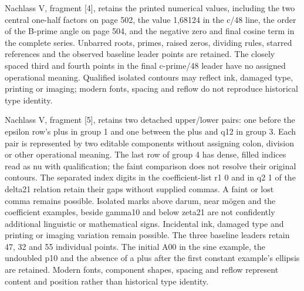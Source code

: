 Nachlass V, fragment [4], retains the printed numerical values, including the two central one-half factors on page 502, the value 1,68124 in the c/48 line, the order of the B-prime angle on page 504, and the negative zero and final cosine term in the complete series. Unbarred roots, primes, raised zeros, dividing rules, starred references and the observed baseline leader points are retained. The closely spaced third and fourth points in the final c-prime/48 leader have no assigned operational meaning. Qualified isolated contours may reflect ink, damaged type, printing or imaging; modern fonts, spacing and reflow do not reproduce historical type identity.

Nachlass V, fragment [5], retains two detached upper/lower pairs: one before the epsilon row’s plus in group 1 and one between the plus and q12 in group 3. Each pair is represented by two editable components without assigning colon, division or other operational meaning. The last row of group 4 has dense, filled indices read as nu with qualification; the faint comparison does not resolve their original contours. The separated index digits in the coefficient-list r1 0 and in q2 1 of the delta21 relation retain their gaps without supplied commas. A faint or lost comma remains possible. Isolated marks above darum, near mögen and the coefficient examples, beside gamma10 and below zeta21 are not confidently additional linguistic or mathematical signs. Incidental ink, damaged type and printing or imaging variation remain possible. The three baseline leaders retain 47, 32 and 55 individual points. The initial A00 in the sine example, the undoubled p10 and the absence of a plus after the first constant example’s ellipsis are retained. Modern fonts, component shapes, spacing and reflow represent content and position rather than historical type identity.

